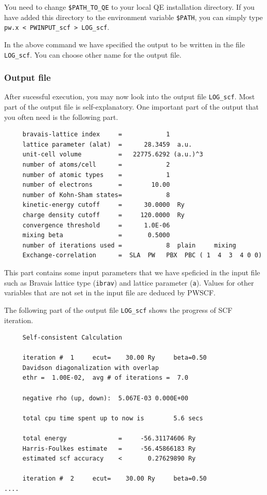 \documentclass[12pt,english]{paper}
\begin{document}
You need to change \texttt{\$PATH\_TO\_QE} to your local QE installation
directory. If you have added this directory to the environment variable
\texttt{\$PATH}, you can simply type \texttt{pw.x < PWINPUT\_scf >
LOG\_scf}.

In the above command we have specified the output to be written in
the file \texttt{LOG\_scf}. You can choose other name for the output
file.


\subsubsection{Output file}

After sucessful execution, you may now look into the output file \texttt{LOG\_scf}.
Most part of the output file is self-explanatory. One important part
of the output that you often need is the following part.

\begin{lstlisting}
     bravais-lattice index     =            1
     lattice parameter (alat)  =      28.3459  a.u.
     unit-cell volume          =   22775.6292 (a.u.)^3
     number of atoms/cell      =            2
     number of atomic types    =            1
     number of electrons       =        10.00
     number of Kohn-Sham states=            8
     kinetic-energy cutoff     =      30.0000  Ry
     charge density cutoff     =     120.0000  Ry
     convergence threshold     =      1.0E-06
     mixing beta               =       0.5000
     number of iterations used =            8  plain     mixing
     Exchange-correlation      =  SLA  PW   PBX  PBC ( 1  4  3  4 0 0)
\end{lstlisting}


This part contains some input parameters that we have speficied in
the input file such as Bravais lattice type (\texttt{ibrav}) and lattice
parameter (\texttt{a}). Values for other variables that are not set
in the input file are deduced by PWSCF.

The following part of the output file \texttt{LOG\_scf} shows the
progress of SCF iteration.

\begin{lstlisting}
     Self-consistent Calculation

     iteration #  1     ecut=    30.00 Ry     beta=0.50
     Davidson diagonalization with overlap
     ethr =  1.00E-02,  avg # of iterations =  7.0

     negative rho (up, down):  5.067E-03 0.000E+00

     total cpu time spent up to now is        5.6 secs

     total energy              =     -56.31174606 Ry
     Harris-Foulkes estimate   =     -56.45866183 Ry
     estimated scf accuracy    <       0.27629890 Ry

     iteration #  2     ecut=    30.00 Ry     beta=0.50
....
\end{lstlisting}
\end{document}
